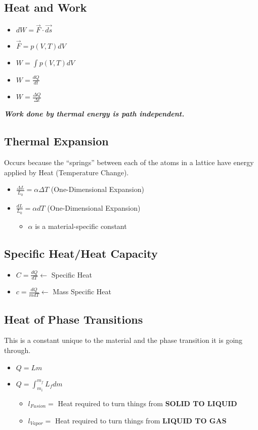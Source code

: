\subsection{Heat and Work}\label{subsec:Heat/Work}
\begin{itemize}[noitemsep, nolistsep]
\item $dW = \vec{F} \cdot \vec{ds}$
\item $\vec{F} = p \left( V, T \right) dV$
\item $W = \int p \left( V, T \right) dV$
\item $W = \frac{dQ}{dt}$
\item $W = \frac{\Delta Q}{\Delta t}$
\end{itemize}
\emph{\textbf{Work done by thermal energy is path independent.}}

\subsection{Thermal Expansion}\label{subsec:Thermal Expansion}
Occurs because the ``springs'' between each of the atoms in a lattice have energy applied by Heat (Temperature Change).
\begin{itemize}
\item $\frac{\Delta L}{L_{0}} = \alpha \Delta T$ (One-Dimensional Expansion)
\item $\frac{dL}{L_{0}} = \alpha dT$ (One-Dimensional Expansion)
  \begin{itemize}[noitemsep, nolistsep]
  \item $\alpha$ is a material-specific constant
  \end{itemize}
\end{itemize}

\subsection{Specific Heat/Heat Capacity}\label{subsec:Specific Heat/Heat Capacity}
\begin{itemize}
\item $C = \frac{dQ}{dT} \leftarrow$ Specific Heat
\item $c = \frac{dQ}{mdT} \leftarrow$ Mass Specific Heat
\end{itemize}

\subsection{Heat of Phase Transitions}\label{subec:Heat Phase Transitions}
This is a constant unique to the material and the phase transition it is going through.
\begin{itemize}[nolistsep]
\item $Q = Lm$
\item $Q = \int_{m_{i}}^{m_{f}} L_{f} dm$
  \begin{itemize}[noitemsep, nolistsep]
  \item $l_{Fusion} = $ Heat required to turn things from \textbf{SOLID TO LIQUID}
  \item $l_{Vapor} = $ Heat required to turn things from \textbf{LIQUID TO GAS}
  \end{itemize}
\end{itemize}

